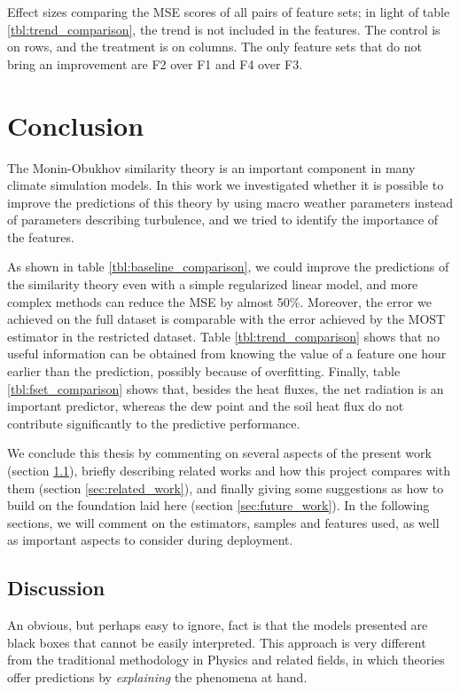 \documentclass[a4paper,11pt]{kth-mag}
\begin{document}
\begin{table}
\caption{Effect sizes comparing the MSE scores of all pairs of feature sets; in light of table \ref{tbl:trend_comparison}, the trend is not included in the features. The control is on rows, and the treatment is on columns. The only feature sets that do not bring an improvement are F2 over F1 and F4 over F3.}
\label{tbl:fset_comparison}

\end{table}


\chapter{Conclusion}
\label{ch:conclusion}
The Monin-Obukhov similarity theory is an important component in many climate simulation models. In this work we investigated whether it is possible to improve the predictions of this theory by using macro weather parameters instead of parameters describing turbulence, and we tried to identify the importance of the features.

As shown in table \ref{tbl:baseline_comparison}, we could improve the predictions of the similarity theory even with a simple regularized linear model, and more complex methods can reduce the MSE by almost 50\%. Moreover, the error we achieved on the full dataset is comparable with the error achieved by the MOST estimator in the restricted dataset. Table \ref{tbl:trend_comparison} shows that no useful information can be obtained from knowing the value of a feature one hour earlier than the prediction, possibly because of overfitting. Finally, table \ref{tbl:fset_comparison} shows that, besides the heat fluxes, the net radiation is an important predictor, whereas the dew point and the soil heat flux do not contribute significantly to the predictive performance.

We conclude this thesis by commenting on several aspects of the present work (section \ref{sec:discussion}), briefly describing related works and how this project compares with them (section \ref{sec:related_work}), and finally giving some suggestions as how to build on the foundation laid here (section \ref{sec:future_work}). In the following sections, we will comment on the estimators, samples and features used, as well as important aspects to consider during deployment.

\section{Discussion}
\label{sec:discussion}
An obvious, but perhaps easy to ignore, fact is that the models presented are black boxes that cannot be easily interpreted. This approach is very different from the traditional methodology in Physics and related fields, in which theories offer predictions by \emph{explaining} the phenomena at hand.
\end{document}
